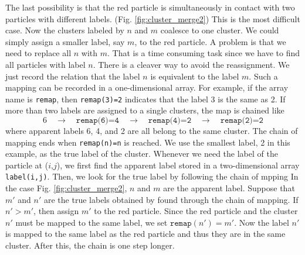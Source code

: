 The last possibility is that the red particle is simultaneously in contact with two particles with different labels. (Fig. \ref{fig:cluster_merge2}) This is the most difficult case.  Now the clusters labeled by $n$ and $m$ coalesce to one cluster. We could simply assign a smaller label, say $m$, to the red particle.  A problem is that we need to replace all $n$ with $m$.   That is a time consuming task since we have to find all particles with label $n$.  There is a cleaver way to avoid the reassignment.  We just record the relation that the label $n$ is equivalent to the label $m$.  Such a mapping can be recorded in a one-dimensional array.  For example, if the array name is \texttt{remap}, then \texttt{remap(3)=2} indicates that the label 3 is the same as 2. If more than two labels are assigned to a single clusters, the map is chained like
\[
6 \quad \rightarrow \quad \texttt{remap(6)=4} \quad \rightarrow \quad  \texttt{remap(4)=2} \quad \rightarrow \quad \texttt{remap(2)=2}
\]
where apparent labels 6, 4, and 2 are all belong to the same cluster.  The chain of mapping ends when \texttt{remap(n)=n} is reached. We use the smallest label, 2 in this example, as the true label of the cluster.  Whenever we need the label of the particle at ($i$,$j$),  we first find the apparent label stored in a two-dimensional array
\texttt{label(i,j)}.  Then, we look for the true label by following the chain of mpping   In the case Fig. \ref{fig:cluster_merge2}, $n$ and $m$ are the apparent label.  Suppose that $m'$ and $n'$ are the true labels obtained by found through the chain of mapping.    If $n'>m'$, then assign $m'$ to the red particle.  Since the red particle and the cluster $n'$ must be mapped to the same label,  we set $\texttt{remap}(n')=m'$.  Now the label $n'$ is mapped to the same label as the red particle and thus they are in the same cluster. After this, the chain is one step longer.




